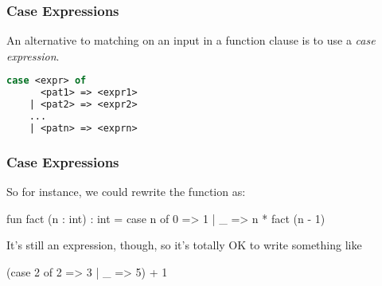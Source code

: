 \documentclass[aspectratio=169, handout]{beamer}
\begin{document}


\begin{frame}[fragile]
  \frametitle{Case Expressions}

  An alternative to matching on an input in a function clause is to
  use a \textit{case expression}.

  \pause

  \begin{lstlisting}[style=15150code, language=sml, numbers=none]
    case <expr> of
      <pat1> => <expr1>
    | <pat2> => <expr2>
    ...
    | <patn> => <exprn>
  \end{lstlisting}

  \vspace{\fill}


  \pause
  \vspace{\fill}

\end{frame}

\begin{frame}[fragile]
  \frametitle{Case Expressions}
  So for instance, we could rewrite the  function as:

  \begin{codeblock}
    fun fact (n : int) : int =
      case n of
        0 => 1
      | _ => n * fact (n - 1)
  \end{codeblock}

  \pause
  \vspace{\fill}


  \pause
  \vspace{\fill}

  It's still an expression, though, so it's totally OK to write something like
  \begin{codeblock}
    (case 2 of
      2 => 3
    | _ => 5) + 1
  \end{codeblock}
\end{frame}
\end{document}
